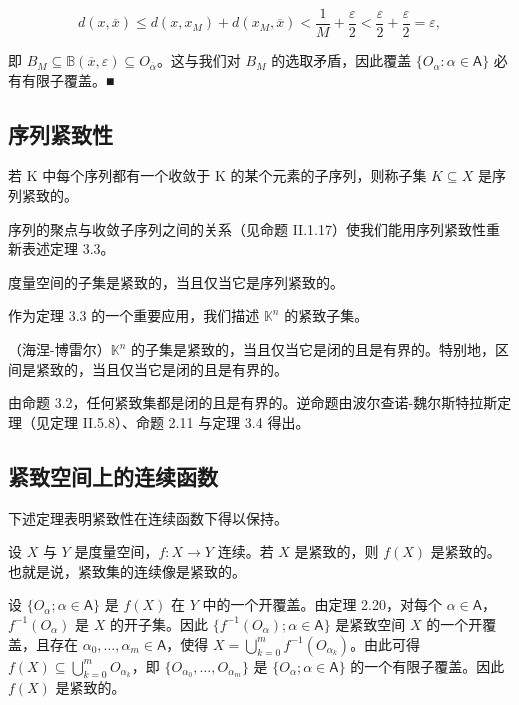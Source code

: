 \begin{theorem}
\begin{items}
\[
d(x,\overline{{x}})\leq d(x,x_{M})+d(x_{M},\overline{{x}})<\frac{1}{M}+\frac{\varepsilon}{2}<\frac{\varepsilon}{2}+\frac{\varepsilon}{2}=\varepsilon,
\]

即 $ B_M \subseteq \mathbb{B}(\overline{x}, \varepsilon) \subseteq O_{\overline{\alpha}} $。这与我们对 $ B_M $ 的选取矛盾，因此覆盖 $ \{O_\alpha : \alpha \in \mathsf{A}\} $ 必有有限子覆盖。■

\end{items}

\end{theorem}

\subsection*{序列紧致性}

若 K 中每个序列都有一个收敛于 K 的某个元素的子序列，则称子集 $ K \subseteq X $ 是序列紧致的。

序列的聚点与收敛子序列之间的关系（见命题 II.1.17）使我们能用序列紧致性重新表述定理 3.3。

\begin{theorem}

度量空间的子集是紧致的，当且仅当它是序列紧致的。

作为定理 3.3 的一个重要应用，我们描述 $ \mathbb{K}^n $ 的紧致子集。

\end{theorem}

\begin{theorem}

（海涅-博雷尔）$ \mathbb{K}^n $ 的子集是紧致的，当且仅当它是闭的且是有界的。特别地，区间是紧致的，当且仅当它是闭的且是有界的。

\proofhead
由命题 3.2，任何紧致集都是闭的且是有界的。逆命题由波尔查诺-魏尔斯特拉斯定理（见定理 II.5.8）、命题 2.11 与定理 3.4 得出。
\end{theorem}

\subsection*{紧致空间上的连续函数}

下述定理表明紧致性在连续函数下得以保持。

\begin{theorem}

设 $X$ 与 $Y$ 是度量空间，$f: X \to Y$ 连续。若 $X$ 是紧致的，则 $f(X)$ 是紧致的。也就是说，紧致集的连续像是紧致的。

\proofhead
设 $\{O_\alpha; \alpha \in \mathsf{A}\}$ 是 $f(X)$ 在 $Y$ 中的一个开覆盖。由定理 2.20，对每个 $\alpha \in \mathsf{A}$，$f^{-1}(O_\alpha)$ 是 $X$ 的开子集。因此 $\{f^{-1}(O_\alpha); \alpha \in \mathsf{A}\}$ 是紧致空间 $X$ 的一个开覆盖，且存在 $\alpha_0, \ldots, \alpha_m \in \mathsf{A}$，使得 $X = \bigcup_{k=0}^m f^{-1}(O_{\alpha_k})$。由此可得 $f(X) \subseteq \bigcup_{k=0}^m O_{\alpha_k}$，即 $\{O_{\alpha_0}, \ldots, O_{\alpha_m}\}$ 是 $\{O_\alpha; \alpha \in \mathsf{A}\}$ 的一个有限子覆盖。因此 $f(X)$ 是紧致的。
\end{theorem}

